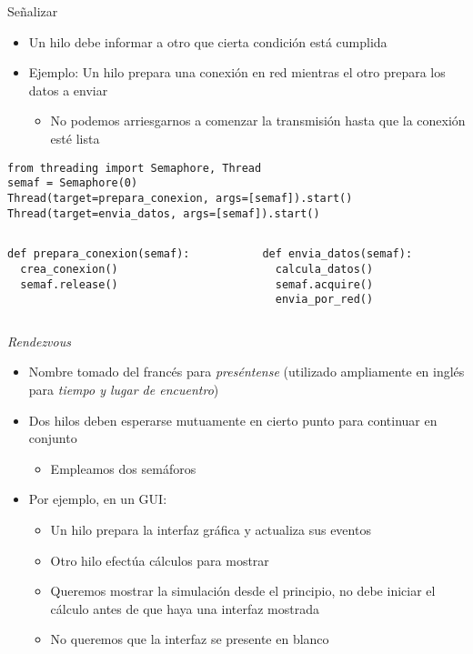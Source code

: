 \documentclass[presentation]{beamer}
\begin{document}
\begin{frame}[label={sec:org9148da3},fragile]{Señalizar}
 \begin{itemize}
\item Un hilo debe informar a otro que cierta condición está cumplida
\item Ejemplo: Un hilo prepara una conexión en red mientras el otro
prepara los datos a enviar
\begin{itemize}
\item No podemos arriesgarnos a comenzar la transmisión hasta que la
conexión esté lista
\end{itemize}
\end{itemize}
\begin{verbatim}
from threading import Semaphore, Thread
semaf = Semaphore(0)
Thread(target=prepara_conexion, args=[semaf]).start()
Thread(target=envia_datos, args=[semaf]).start()
\end{verbatim}
\begin{columns}\begin{column}{0.5\textwidth}
\begin{verbatim}
def prepara_conexion(semaf):
  crea_conexion()
  semaf.release()
\end{verbatim}
\end{column} \begin{column}{0.5\textwidth}
\begin{verbatim}
def envia_datos(semaf):
  calcula_datos()
  semaf.acquire()
  envia_por_red()
\end{verbatim}
\end{column}\end{columns}
\end{frame}

\begin{frame}[label={sec:org3d2a24b}]{\emph{Rendezvous}}
\begin{itemize}
\item Nombre tomado del francés para \emph{preséntense} (utilizado ampliamente
en inglés para \emph{tiempo y lugar de encuentro})
\item Dos hilos deben esperarse mutuamente en cierto punto para continuar
en conjunto
\begin{itemize}
\item Empleamos dos semáforos
\end{itemize}
\item Por ejemplo, en un GUI:
\begin{itemize}
\item Un hilo prepara la interfaz gráfica y actualiza sus eventos
\item Otro hilo efectúa cálculos para mostrar
\item Queremos mostrar la simulación desde el principio, no debe iniciar
el cálculo antes de que haya una interfaz mostrada
\item No queremos que la interfaz se presente en blanco
\end{itemize}
\end{itemize}
\end{frame}
\end{document}
